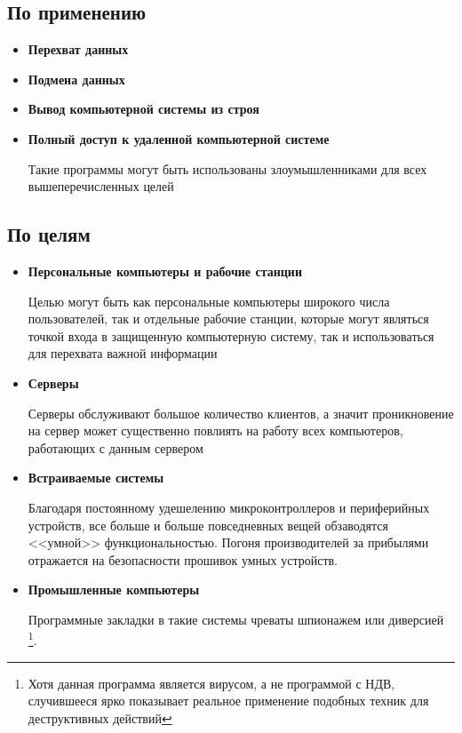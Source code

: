     \subsection{По применению}\label{sec:ch1/sec2/sub1}
    \begin{itemize}
        \item \textbf{Перехват данных}
        \item \textbf{Подмена данных}
        \item \textbf{Вывод компьютерной системы из строя}
        \item \textbf{Полный доступ к удаленной компьютерной системе}

              Такие программы могут быть использованы злоумышленниками для
              всех вышеперечисленных целей
    \end{itemize}
\subsection{По целям}\label{sec:ch1/sec2/sub2}
\begin{itemize}
    \item \textbf{Персональные компьютеры и рабочие станции}
          
          Целью могут быть как персональные компьютеры широкого числа пользователей,
          так и отдельные рабочие станции, которые могут являться точкой входа в
          защищенную компьютерную систему, так и использоваться для перехвата важной
          информации
    \item \textbf{Серверы}
          
          Серверы обслуживают большое количество клиентов, а значит проникновение на
          сервер может существенно повлиять на работу всех компьютеров, работающих с
          данным сервером
    \item \textbf{Встраиваемые системы}

          Благодаря постоянному удешелению микроконтроллеров и периферийных устройств,
          все больше и больше повседневных вещей обзаводятся <<умной>> функциональностью.
          Погоня производителей за прибылями отражается на безопасности прошивок умных устройств.
    \item \textbf{Промышленные компьютеры}

        Программные закладки в такие системы чреваты шпионажем или диверсией\autocite{stuxnet}
        \footnote{Хотя данная программа является вирусом, а не программой с НДВ, случившееся
        ярко показывает реальное применение подобных техник для деструктивных действий}.
\end{itemize}

